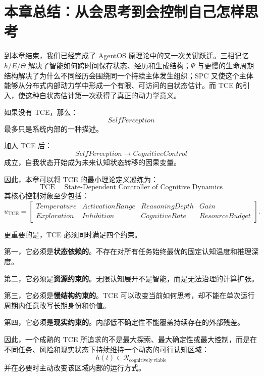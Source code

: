 \section{本章总结：从会思考到会控制自己怎样思考}

到本章结束，我们已经完成了 AgentOS 原理论中的又一次关键跃迁。三相记忆 $h/E/\Theta$ 解决了智能如何跨时间保存状态、经历和生成结构；$\Psi$ 与更慢的生命周期结构解决了为什么不同经历会围绕同一个持续主体发生组织；SPC 又使这个主体能够从分布式内部动力学中形成一个有限、可访问的自状态估计。而 TCE 的引入，使这种自状态估计第一次获得了真正的动力学意义。

如果没有 TCE，那么：
\begin{equation}
    SelfPerception
\end{equation}
最多只是系统内部的一种描述。

加入 TCE 后：
\begin{equation}
    SelfPerception
    \rightarrow
    CognitiveControl
\end{equation}
成立，自我状态开始成为未来认知状态转移的因果变量。

因此，本章可以将 TCE 的最小理论定义凝练为：
\begin{equation}
    \boxed{
    \mathrm{TCE}
    =
    \text{State-Dependent Controller of Cognitive Dynamics}
    }
\end{equation}
其核心控制对象至少包括：
\begin{equation}
    u_{\mathrm{TCE}}
    =
    \begin{bmatrix}
    Temperature & ActivationRange & ReasoningDepth & Gain\\
    Exploration & Inhibition & CognitiveRate & ResourceBudget
    \end{bmatrix}.
\end{equation}

更重要的是，TCE 必须同时满足四个约束。

第一，它必须是\textbf{状态依赖的}。不存在对所有任务始终最优的固定认知温度和推理深度。

第二，它必须是\textbf{资源约束的}。无限认知展开不是智能，而是无法治理的计算扩张。

第三，它必须是\textbf{慢结构约束的}。TCE 可以改变当前如何思考，却不能在单次运行周期内任意改写长期身份和价值。

第四，它必须是\textbf{现实约束的}。内部低不确定性不能覆盖持续存在的外部残差。

因此，一个成熟的 TCE 所追求的不是最大探索、最大确定性或最大控制，而是在不同任务、风险和现实状态下持续维持一个动态的可行认知区域：
\begin{equation}
    \boxed{
    h(t)
    \in
    \mathcal R_{\mathrm{cognitively\ viable}}
    }
\end{equation}
并在必要时主动改变该区域内部的运行方式。


